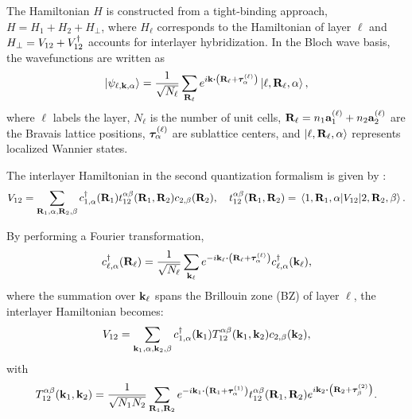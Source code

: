 The Hamiltonian $H$ is constructed from a tight-binding approach, $H = H_1 + H_2 + H_{\perp}$, where $H_\ell$ corresponds to the Hamiltonian of layer $\ell$ and $H_\perp = V_{12} + V_{12}^{\dagger}$ accounts for interlayer hybridization. In the Bloch wave basis, the wavefunctions are written as
\begin{equation} \label{eq:BM-blochwave}
\ket{\psi_{\ell, \k, \alpha}} = \frac{1}{\sqrt{N_\ell}} \sum_{\R_\ell} e^{i \k \vdot \qty(\R_\ell + \vtau_{\alpha}^{(\ell)})} \ket{\ell, \R_\ell, \alpha},
\end{equation}
where $\ell$ labels the layer, $N_\ell$ is the number of unit cells, ${\vb{R}}_\ell = n_1 {\vb{a}}_1^{(\ell)} + n_2 {\vb{a}}_2^{(\ell)}$ are the Bravais lattice positions, ${\bm{\tau}}_{\alpha}^{(\ell)}$ are sublattice centers, and $\ket{\ell,{\vb{R}}_\ell,\alpha}$ represents localized Wannier states.


The interlayer Hamiltonian in the second quantization formalism is given by \cite{handbook2019}:
\begin{equation} \label{eq:interlayer-hopping}
V_{12} = \sum_{{\vb{R}}_1,\alpha,{\vb{R}}_2,\beta} c_{1,\alpha}^{\dagger}({\vb{R}}_1) t_{12}^{\alpha\beta}({\vb{R}}_1,{\vb{R}}_2) c_{2,\beta}({\vb{R}}_2), \quad
t_{12}^{\alpha\beta}({\vb{R}}_1,{\vb{R}}_2) =
\mel{1,{\vb{R}}_1,\alpha}{V_{12}}{2,{\vb{R}}_2,\beta}.
\end{equation}

By performing a Fourier transformation,
\begin{equation} \label{eq:blg-fourier}
c_{\ell,\alpha}^\d(\R_\ell) = \frac{1}{\sqrt{N_\ell}} \sum_{\k_\ell}
e^{-i\k_\ell \vdot \qty(\R_\ell + \vtau_{\alpha}^{(\ell)})} c_{\ell,\alpha}^\d(\k_\ell),
\end{equation}
where the summation over ${\vb{k}}_\ell$ spans the Brillouin zone (BZ) of layer $\ell$, the interlayer Hamiltonian becomes:
\begin{equation} \label{eq:interlayer-hopping-kspace}
V_{12} = \sum_{{\vb{k}}_1,\alpha,{\vb{k}}_2,\beta} c_{1,\alpha}^{\dagger}({\vb{k}}_1) T_{12}^{\alpha\beta}({\vb{k}}_1,{\vb{k}}_2) c_{2,\beta}({\vb{k}}_2),
\end{equation}
with
\begin{equation} \label{eq:interlayer-hopping-Tkspace}
T_{12}^{\alpha\beta}(\k_1,\k_2) =
\frac{1}{\sqrt{N_1 N_2}} \sum_{\R_1,\R_2} e^{-i\k_1\vdot\qty(\R_1+\vtau_{\alpha}^{(1)})}
t_{12}^{\alpha\beta}(\R_1,\R_2) e^{i\k_2\vdot\qty(\R_2+\vtau_{\beta}^{(2)})}.
\end{equation}

